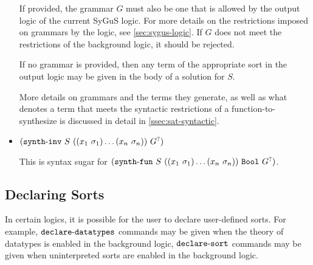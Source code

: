 \documentclass[english,a4paper,10pt]{article}
\begin{document}
\begin{itemize}
If provided, the grammar $G$ must also be one that is allowed
by the output logic of the current SyGuS logic.
For more details on the restrictions imposed on grammars by the logic,
see \cref{sec:sygus-logic}.
If $G$ does not meet the restrictions
of the background logic, it should be rejected.

If no grammar is provided,
then any term of the appropriate sort
in the output logic may be given in the body of a solution for $S$.

More details on grammars and the terms
they generate, as well as what denotes a term that meets the syntactic
restrictions of a function-to-synthesize
is discussed in detail in \cref{ssec:sat-syntactic}.

\begin{comment}
If $G$ is not provided,
then this command is syntax
sugar for
$\paren{\synthfunkwd\mbox{ }S\mbox{ }
\paren{\paren{x_1\mbox{ }\sigma_1} \ldots \paren{x_n\mbox{ }\sigma_n} }\mbox{ }\sigma\mbox{ }
G_{\mathcal{L},\vec{x},\sigma}}$
where $G_{\mathcal{L},\vec{x},\sigma}$ is a grammar that
generates all well-sorted terms of sort $\sigma$ 
that belong to the language of the current background logic $\mathcal{L}$,
and whose free variables are in $\vec{x} = (x_1, \ldots, x_n)$.
\end{comment}

\item ${\tt (}{\tt synth\mbox{-}inv}\mbox{ }S\mbox{ }{\tt (}{\tt (}x_1\mbox{ }\sigma_1{\tt )} \ldots {\tt (}x_n\mbox{ }\sigma_n{\tt )} {\tt )}\mbox{ }G^{?}{\tt )}$

This is syntax sugar for
${\tt (}{\tt synth\mbox{-}fun}\mbox{ }S\mbox{ }{\tt (}{\tt (}x_1\mbox{ }\sigma_1{\tt )} \ldots {\tt (}x_n\mbox{ }\sigma_n{\tt )} {\tt )}\mbox{ }{\tt Bool}\mbox{ }G^{?}{\tt )}$.
\end{itemize}

\subsection{Declaring Sorts}
\label{ssec:declaring-sorts}

In certain logics, 
it is possible for the user to declare user-defined sorts.
For example, 
${\tt declare\mbox{-}datatypes}$ commands may be given
when the theory of datatypes is enabled in the background
logic,
${\tt declare\mbox{-}sort}$ commands may be given
when uninterpreted sorts are enabled in the background logic.
\end{document}

